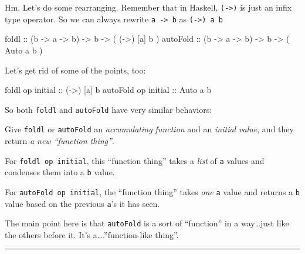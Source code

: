 \documentclass[]{article}
\newenvironment{Shaded}{}{}
\newcommand{\DataTypeTok}[1]{\textcolor[rgb]{0.56,0.13,0.00}{#1}}
\newcommand{\FunctionTok}[1]{\textcolor[rgb]{0.02,0.16,0.49}{#1}}
\newcommand{\NormalTok}[1]{#1}
\newcommand{\OtherTok}[1]{\textcolor[rgb]{0.00,0.44,0.13}{#1}}
\begin{document}
Hm. Let's do some rearranging. Remember that in Haskell,
\texttt{(-\textgreater{})} is just an infix type operator. So we can always
rewrite \texttt{a\ -\textgreater{}\ b} as \texttt{(-\textgreater{})\ a\ b}

\begin{Shaded}
\begin{Highlighting}[]
\FunctionTok{foldl}\OtherTok{      ::}\NormalTok{ (b }\OtherTok{{-}\textgreater{}}\NormalTok{ a }\OtherTok{{-}\textgreater{}}\NormalTok{ b) }\OtherTok{{-}\textgreater{}}\NormalTok{ b }\OtherTok{{-}\textgreater{}}\NormalTok{ ( (}\OtherTok{{-}\textgreater{}}\NormalTok{) [a] b )}
\OtherTok{autoFold   ::}\NormalTok{ (b }\OtherTok{{-}\textgreater{}}\NormalTok{ a }\OtherTok{{-}\textgreater{}}\NormalTok{ b) }\OtherTok{{-}\textgreater{}}\NormalTok{ b }\OtherTok{{-}\textgreater{}}\NormalTok{ ( }\DataTypeTok{Auto}\NormalTok{  a  b )}
\end{Highlighting}
\end{Shaded}

Let's get rid of some of the points, too:

\begin{Shaded}
\begin{Highlighting}[]
\FunctionTok{foldl}\NormalTok{    op}\OtherTok{ initial  ::}\NormalTok{ (}\OtherTok{{-}\textgreater{}}\NormalTok{) [a] b}
\NormalTok{autoFold op}\OtherTok{ initial  ::} \DataTypeTok{Auto}\NormalTok{  a  b}
\end{Highlighting}
\end{Shaded}

So both \texttt{foldl} and \texttt{autoFold} have very similar behaviors:

Give \texttt{foldl} or \texttt{autoFold} an \emph{accumulating function} and an
\emph{initial value}, and they return \emph{a new ``function thing''}.

For \texttt{foldl\ op\ initial}, this ``function thing'' takes a \emph{list} of
\texttt{a} values and condenses them into a \texttt{b} value.

For \texttt{autoFold\ op\ initial}, the ``function thing'' takes \emph{one}
\texttt{a} value and returns a \texttt{b} value based on the previous
\texttt{a}'s it has seen.

The main point here is that \texttt{autoFold} is a sort of ``function'' in a
way\ldots just like the others before it. It's a\ldots.''function-like thing''.

\begin{center}\rule{0.5\linewidth}{0.5pt}\end{center}
\end{document}
